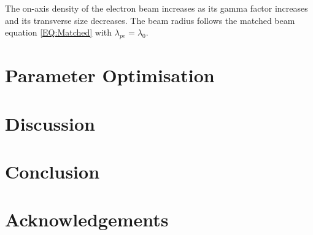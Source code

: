 \documentclass[aps,prstab,reprint,amsmath,amssymb,groupedaddress]{revtex4-1}
\begin{document}
The on-axis density of the electron beam increases as its gamma factor increases and its transverse size decreases. The
beam radius follows the matched beam equation \ref{EQ:Matched} with $\lambda_{pe} = \lambda_{0}$.



\section[\label{S:PO}]{Parameter Optimisation}


\section[\label{S:D}]{Discussion}

\section[\label{S:C}]{Conclusion}

\section[\label{Ack}]{Acknowledgements}
\end{document}
